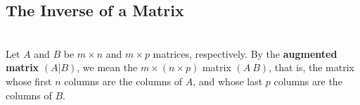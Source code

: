 \subsection*{The Inverse of a Matrix}

\begin{definition}
	\hfill\\
	Let $A$ and $B$ be $m \times n$ and $m \times p$ matrices, respectively. By the \textbf{augmented matrix} $(A|B)$, we mean the $m \times (n \times p)$ matrix $(A\ B)$, that is, the matrix whose first $n$ columns are the columns of $A$, and whose last $p$ columns are the columns of $B$.
\end{definition}
